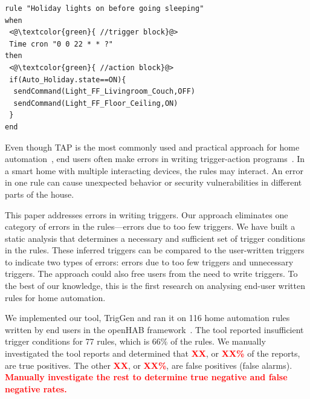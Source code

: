 \documentclass{sig-alternate-05-2015}
\newcommand\todo[1]{\textbf{\textcolor{red}{#1}}}
\begin{document}
\begin{lstlisting}[caption={A rule for turning on the ceiling light on the first floor (FF) and turning off the light next to the living room couch at 10 pm during holiday mode. },label={lst:rule}]
rule "Holiday lights on before going sleeping"
when
 <@\textcolor{green}{ //trigger block}@>
 Time cron "0 0 22 * * ?" 
then
 <@\textcolor{green}{ //action block}@>
 if(Auto_Holiday.state==ON){
  sendCommand(Light_FF_Livingroom_Couch,OFF)
  sendCommand(Light_FF_Floor_Ceiling,ON)
 }
end
\end{lstlisting}

Even though TAP is the most commonly used and practical approach for home
automation~\cite{practical-tap}, end users often make errors in writing
trigger-action programs~\cite{Huang,wild-tap}.  In a smart home with
multiple interacting devices, the rules may interact.  An error in one rule
can cause unexpected behavior or security vulnerabilities in different
parts of the house.

This paper addresses errors in writing triggers.  Our approach eliminates
one category of errors in the rules---errors due to too few triggers.  We
have built a static analysis that determines a necessary and sufficient set
of trigger conditions in the rules.  These inferred triggers can be
compared to the user-written triggers to indicate two types of errors:
errors due to too few triggers and unnecessary triggers.  The approach
could also free users from the need to write triggers.
To the best of our knowledge, this is the first research on analysing
end-user written rules for home automation.

We implemented our tool, TrigGen and ran it on 116 home automation rules 
written by end users in the openHAB framework~\cite{openhab}.  The tool reported
insufficient trigger conditions for 77 rules, which is 66\%
of the rules.  We manually investigated the tool reports and determined
that \todo{XX}, or \todo{XX\%} of the reports, are true positives.  The other 
\todo{XX}, or \todo{XX\%}, are false positives (false alarms).
\todo{Manually investigate the rest to determine true negative and false
  negative rates.}
\end{document}
